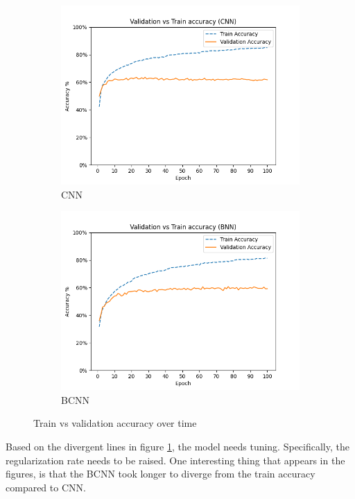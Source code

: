 \documentclass[12pt]{article}
\begin{document}
\begin{figure}[H]
	\centering
	\begin{subfigure}{.5\textwidth}
		\centering
		\includegraphics[width=\linewidth]{../Images/CNN_val_acc_over_time}
		\caption{CNN}
	\end{subfigure}%
	\begin{subfigure}{.5\textwidth}
		\centering
		\includegraphics[width=\linewidth]{../Images/BNN_val_acc_over_time}
		\caption{BCNN}
	\end{subfigure}
	\caption{Train vs validation accuracy over time}
	\label{fig:train-v-val}
\end{figure}

Based on the divergent lines in figure \ref{fig:train-v-val}, the model needs tuning. Specifically, the regularization rate needs to be raised. One interesting thing that appears in the figures, is that the BCNN took longer to diverge from the train accuracy compared to CNN.
\end{document}
